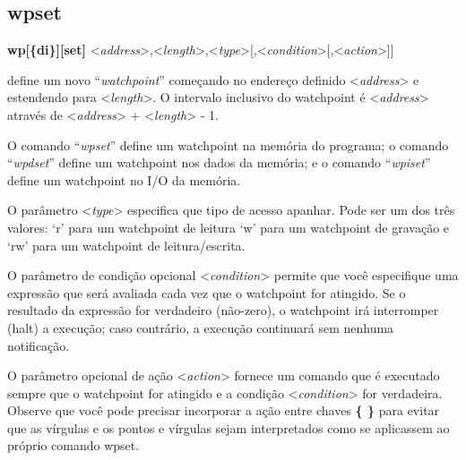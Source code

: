 \documentclass[letterpaper,10pt,brazil]{sphinxmanual}
\begin{document}
\subsection{wpset}
\label{debugger/watchpoint:wpset}\label{debugger/watchpoint:debugger-command-wpset}
\begin{DUlineblock}{0em}
\item[]
\begin{DUlineblock}{\DUlineblockindent}
\item[] \textbf{wp{[}\{d\textbar{}i\}{]}{[}set{]}} \textless{}\emph{address}\textgreater{},\textless{}\emph{length}\textgreater{},\textless{}\emph{type}\textgreater{}{[},\textless{}\emph{condition}\textgreater{}{[},\textless{}\emph{action}\textgreater{}{]}{]}
\item[] 
\end{DUlineblock}
\item[] define um novo ``\emph{watchpoint}'' começando no endereço definido \textless{}\emph{address}\textgreater{} e estendendo para \textless{}\emph{length}\textgreater{}. O intervalo inclusivo do watchpoint é \textless{}\emph{address}\textgreater{} através de \textless{}\emph{address}\textgreater{} + \textless{}\emph{length}\textgreater{} - 1.
\item[] O comando ``\emph{wpset}'' define um watchpoint na memória do programa; o comando ``\emph{wpdset}'' define um watchpoint nos dados da memória; e o comando ``\emph{wpiset}'' define um watchpoint no I/O da memória.
\item[] O parâmetro \textless{}\emph{type}\textgreater{} especifica que tipo de acesso apanhar. Pode ser um dos três valores: `r' para um watchpoint de leitura `w' para um watchpoint de gravação e `rw' para um watchpoint de leitura/escrita.
\item[] 
\item[] O parâmetro de condição opcional \textless{}\emph{condition}\textgreater{} permite que você especifique uma expressão que será avaliada cada vez que o watchpoint for atingido. Se o resultado da expressão for verdadeiro (não-zero), o watchpoint irá interromper (halt) a execução; caso contrário, a execução continuará sem nenhuma notificação.
\item[] O parâmetro opcional de ação \textless{}\emph{action}\textgreater{} fornece um comando que é executado sempre que o watchpoint for atingido e a condição \textless{}\emph{condition}\textgreater{} for verdadeira. Observe que você pode precisar incorporar a ação entre chaves \textbf{\{ \}} para evitar que as vírgulas e os pontos e vírgulas sejam interpretados como se aplicassem ao próprio comando wpset.

\end{DUlineblock}
\end{document}
